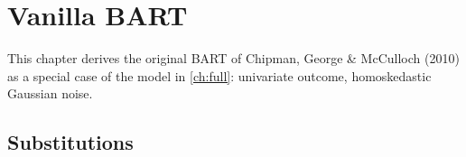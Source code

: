 \chapter{Vanilla BART}
\label{ch:vanilla}

This chapter derives the original BART of Chipman, George \& McCulloch (2010)
as a special case of the model in \autoref{ch:full}: univariate outcome,
homoskedastic Gaussian noise.

\section{Substitutions}
\label{sec:subst}

